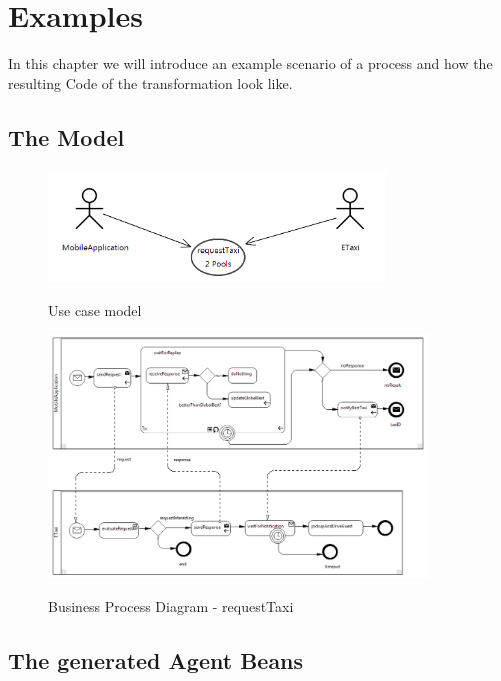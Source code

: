 \chapter{Examples}
\label{chap:examples}

In this chapter we will introduce an example scenario of a process and how the resulting Code of the transformation look like.


\section{The Model}
\begin{figure}
	\centering
		\includegraphics[width=0.8\textwidth]{images/example/usecase.png}
	\label{fig:usecase}
	\caption{Use case model}
\end{figure}

\begin{figure}
	\centering
		\includegraphics[width = 0.9\textwidth]{images/example/requestTaxi.png}
	\label{fig:usecase}
	\caption{Business Process Diagram - requestTaxi}
\end{figure}

\newpage
\section{The generated Agent Beans}